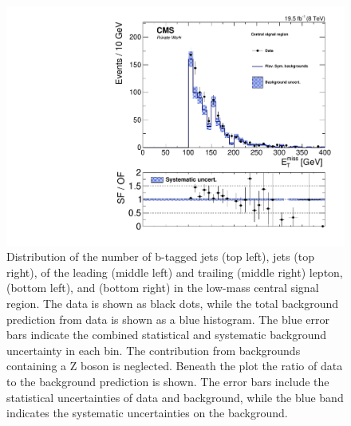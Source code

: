 \begin{figure}[htbp]
\begin{minipage}[t]{0.49\textwidth}
\end{minipage}
\begin{minipage}[t]{0.49\textwidth}
\includegraphics[width=\textwidth]{plots/results/rSFOFDependencies/rSFOFDependency_SignalCentral_MET_Full2012_SF_lowMass.pdf}
\end{minipage}
\caption{Distribution of the number of b-tagged jets (top left), jets (top right), \pt of the leading (middle left) and trailing (middle right) lepton, \HT (bottom left), and \MET (bottom right) in the low-mass central signal region. The data is shown as black dots, while the total background prediction from data is shown as a blue histogram. The blue error bars indicate the combined statistical and systematic background uncertainty in each bin. The contribution from backgrounds containing a Z boson is neglected. Beneath the plot the ratio of data to the background prediction is shown. The error bars include the statistical uncertainties of data and background, while the blue band indicates the systematic uncertainties on the background. }
\label{fig:dependencies}
\end{figure}


